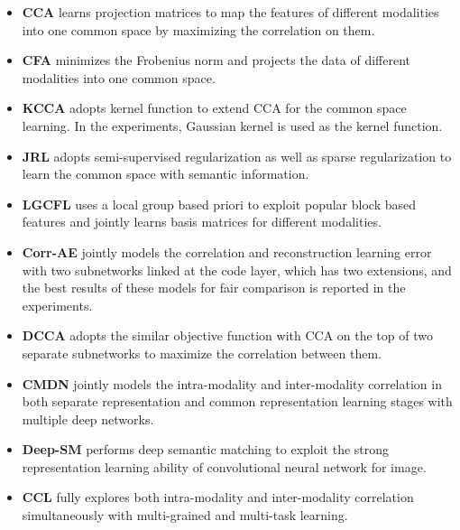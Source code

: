 \documentclass[journal]{IEEEtran}
\begin{document}
\begin{itemize}
	\item {\bf CCA} \cite{HotelingBiometrika36RelationBetweenTwoVariates} learns projection matrices to map the features of different modalities into one common space by maximizing the correlation on them.
	
	\item {\bf CFA} \cite{LiMM03CFA} minimizes the Frobenius norm and projects  the data of different modalities into one common space.
	
	\item {\bf KCCA} \cite{DBLP:journals/neco/HardoonSS04} adopts kernel function to extend CCA for the common space learning. In the experiments, Gaussian kernel is used as the kernel function.
	
	\item {\bf JRL} \cite{ZhaiTCSVT2014JRL} adopts semi-supervised regularization as well as sparse regularization to learn the common space with semantic information.
	
	\item {\bf LGCFL} \cite{DBLP:journals/tmm/KangXLXP15} uses a local group based priori to exploit popular block based features and jointly learns basis matrices for different modalities.
	
	\item {\bf Corr-AE} \cite{feng12014cross} jointly models the correlation and reconstruction learning error with two subnetworks linked at the code layer, which has two extensions, and the best results of these models for fair comparison is reported in the experiments.
	
	\item {\bf DCCA} \cite{DBLP:conf/cvpr/YanM15} adopts the similar objective function with CCA on the top of two separate subnetworks to maximize the correlation between them.
	
	\item {\bf CMDN} \cite{DBLP:conf/ijcai/PengHQ16} jointly models the intra-modality and inter-modality correlation in both separate representation and common representation learning stages with multiple deep networks.
	
	\item {\bf Deep-SM} \cite{DBLP:journals/tcyb/WeiZLWLZY17} performs deep semantic matching to exploit the strong representation learning ability of convolutional neural network for image.
	
	\item {\bf CCL} \cite{peng2017ccl} fully explores both intra-modality and inter-modality correlation simultaneously with multi-grained and multi-task learning.
	
\end{itemize}
\end{document}
